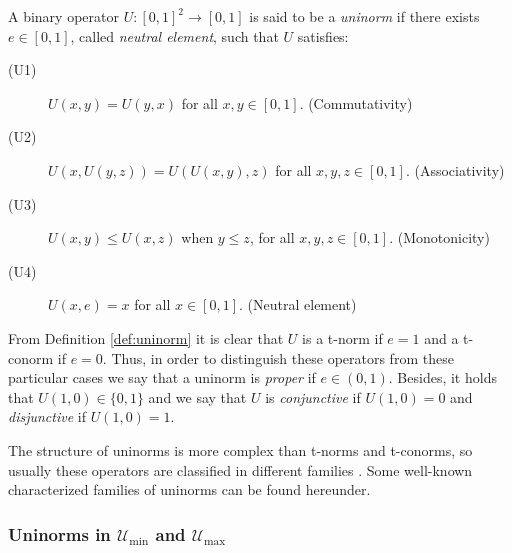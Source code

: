 \begin{definition}\label{def:uninorm}
	A binary operator $U:[0,1]^2 \to [0,1]$ is said to be a \emph{uninorm} if there exists $e \in [0,1]$, called \emph{neutral element}, such that $U$ satisfies:
	\begin{description}
		\item[(U1)] $U(x,y)=U(y,x)$ for all $x,y \in [0,1]$. \hfill (Commutativity)
		\item[(U2)] $U(x,U(y,z))=U(U(x,y),z)$ for all $x,y,z \in [0,1]$. \hfill (Associativity)
		\item[(U3)] $U(x,y) \leq U(x,z)$ when $y \leq z$, for all $x,y,z \in [0,1]$. \hfill (Monotonicity)
		\item[(U4)] $U(x,e)=x$ for all $x \in [0,1]$. \hfill (Neutral element)
	\end{description}
\end{definition}

From Definition \ref{def:uninorm} it is clear that $U$ is a t-norm if $e=1$ and a t-conorm if $e=0$. Thus, in order to distinguish these operators from these particular cases we say that a uninorm is \emph{proper} if $e \in (0,1)$. Besides, it holds that $U(1,0) \in \{0,1\}$ and we say that $U$ is \emph{conjunctive} if $U(1,0)=0$ and \emph{disjunctive} if $U(1,0)=1$.

The structure of uninorms is more complex than t-norms and t-conorms, so usually these operators are classified in different families \cite{Mas2015}. Some well-known characterized families of uninorms can be found hereunder.

\subsubsection{Uninorms in $\mathcal{U}_{\min}$ and $\mathcal{U}_{\max}$}

